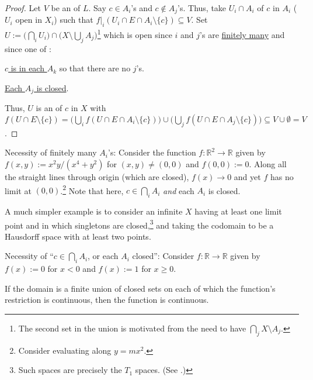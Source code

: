 	\begin{proof}
		Let $V$ be an \onbd of $L$. Say $c\in A_i$'s and $c\notin A_j$'s. Thus, take  $U_i\cap A_i$ of $c$ in $A_i$ ($U_i$ open in $X_i$) such that $f|_i(U_i\cap E\cap A_i\setminus\{c\})\subseteq V$. Set $U := \bigl( \bigcap_i U_i \bigr)\cap \bigl(X\setminus \bigcup_j A_j\bigr)$\footnote{
			The second set in the union is motivated from the need to have $\bigcap_j X\setminus A_j$.
		} which is open since $i$ and $j$'s are \uline{finitely many} and since one of :
		\begin{mylist}
			\item \uline{$c$ is in each $A_k$} so that there are no $j$'s.
			\item \uline{Each $A_j$ is closed}.
		\end{mylist}
		Thus, $U$ is an \onbd of $c$ in $X$ with $f(U\cap E\setminus\{c\}) 
		= \bigl( \bigcup_i f(U\cap E\cap A_i\setminus\{c\}) \bigr)
			\cup \bigl( \bigcup_j f(U\cap E\cap A_j\setminus\{c\}) \bigr)
		\subseteq V\cup \emptyset = V$.
	\end{proof}
	
	\begin{rmk}
		\begin{mylist}
			\item Necessity of finitely many $A_i$'s: 
			Consider the function $f\colon \mathbb R^2\to\mathbb R$ given by $f(x, y) := x^2y/(x^4 + y^2)$ for $(x, y)\ne (0, 0)$ and $f(0, 0) := 0$. Along all the straight lines through origin (which are closed), $f(x)\to 0$ and yet $f$ has no limit at $(0, 0)$.\footnote{
				Consider evaluating along $y = mx^2$.
			} Note that here, $c\in \bigcap_i A_i$ \emph{and} each $A_i$ is closed.
			
			A much simpler example is to consider an infinite $X$ having at least one limit point and in which singletons are closed,\footnote{
				Such spaces are precisely the $T_1$ spaces. (See .)
			} and taking the codomain to be a Hausdorff space with at least two points.
			
			
			\item Necessity of ``$c\in\bigcap_i A_i$, or each $A_i$ closed'': Consider $f\colon \mathbb{R\to R}$ given by $f(x) := 0$ for $x < 0$ and $f(x) := 1$ for $x\ge 0$.
		\end{mylist}
	\end{rmk}
	
	\begin{cor}
		If the domain is a finite union of closed sets on each of which the function's restriction is continuous, then the function is continuous.
	\end{cor}
	
